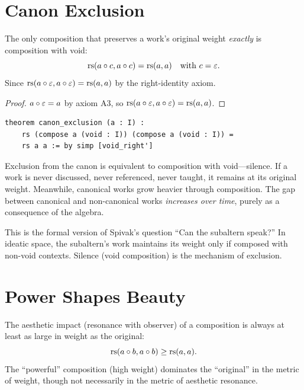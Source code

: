 \section{Canon Exclusion}

\begin{theorem}
\label{thm:exclusion}
The only composition that preserves a work's original weight
\emph{exactly} is composition with void:
\[
  \mathrm{rs}(a \circ c, a \circ c) = \mathrm{rs}(a, a) \quad \text{with } c = \varepsilon.
\]
Since $\mathrm{rs}(a \circ \varepsilon, a \circ \varepsilon) = \mathrm{rs}(a, a)$ by
the right-identity axiom.
\end{theorem}

\begin{proof}
$a \circ \varepsilon = a$ by axiom A3, so
$\mathrm{rs}(a \circ \varepsilon, a \circ \varepsilon) = \mathrm{rs}(a, a)$.
\end{proof}

\begin{lstlisting}
theorem canon_exclusion (a : I) :
    rs (compose a (void : I)) (compose a (void : I)) =
    rs a a := by simp [void_right']
\end{lstlisting}

\begin{interpretation}
Exclusion from the canon is equivalent to composition with void---silence.
If a work is never discussed, never referenced, never taught, it
remains at its original weight.  Meanwhile, canonical works grow heavier
through composition.  The gap between canonical and non-canonical works
\emph{increases over time}, purely as a consequence of the algebra.

This is the formal version of Spivak's question ``Can the subaltern
speak?''  In ideatic space, the subaltern's work maintains its weight
only if composed with non-void contexts.  Silence (void composition)
is the mechanism of exclusion.
\end{interpretation}

\section{Power Shapes Beauty}

\begin{theorem}
\label{thm:power-beauty}
The aesthetic impact (resonance with observer) of a composition is
always at least as large in weight as the original:
\[
  \mathrm{rs}(a \circ b, a \circ b) \geq \mathrm{rs}(a, a).
\]
The ``powerful'' composition (high weight) dominates the ``original''
in the metric of weight, though not necessarily in the metric of
aesthetic resonance.
\end{theorem}

